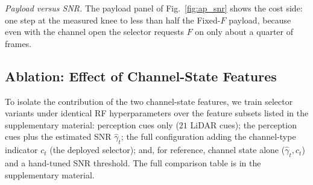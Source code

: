 \documentclass[journal]{IEEEtran}
\begin{document}
\emph{Payload versus SNR.}\label{sec:payload_snr} The payload panel of Fig.~\ref{fig:ap_snr} shows the cost side: one step at the measured knee to less than half the Fixed-$F$ payload, because even with the channel open the selector requests $F$ on only about a quarter of frames.

\subsection{Ablation: Effect of Channel-State Features}\label{sec:ablation}

To isolate the contribution of the two channel-state features, we train selector variants under identical RF hyperparameters over the feature subsets listed in the supplementary material: perception cues only ($21$ LiDAR cues); the perception cues plus the estimated SNR $\hat\gamma_t$; the full configuration adding the channel-type indicator $c_t$ (the deployed selector); and, for reference, channel state alone ($\hat\gamma_t,c_t$) and a hand-tuned SNR threshold. The full comparison table is in the supplementary material.
\end{document}
